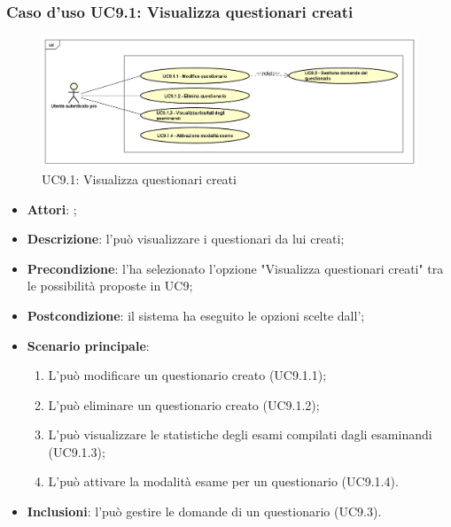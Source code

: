 		\subsubsection{Caso d'uso UC9.1: Visualizza questionari creati}
		\label{UC9.1}
		\begin{figure}[h]
			\centering
		\includegraphics[scale=0.5,keepaspectratio]{UML/UC9_1.png}
			\caption{UC9.1: Visualizza questionari creati}
		\end{figure}
		\FloatBarrier
		\begin{itemize}
			\item \textbf{Attori}: \uaupro;
			\item \textbf{Descrizione}: l'\uaupro può visualizzare i questionari da lui creati;
			\item \textbf{Precondizione}: l'\uaupro ha selezionato l'opzione "Visualizza questionari creati" tra le possibilità proposte in UC9;
			\item \textbf{Postcondizione}: il sistema ha eseguito le opzioni scelte dall'\uaupro;
			\item \textbf{Scenario principale}: 
				\begin{enumerate}
					\item L'\uaupro può modificare un questionario creato (UC9.1.1);
					\item L'\uaupro può eliminare un questionario creato (UC9.1.2);
					\item L'\uaupro può visualizzare le statistiche degli esami compilati dagli esaminandi (UC9.1.3);
					\item L'\uaupro può attivare la modalità esame per un questionario (UC9.1.4).
				\end{enumerate}
				\item \textbf{Inclusioni}: l'\uaupro può gestire le domande di un questionario (UC9.3).
		\end{itemize}
		
